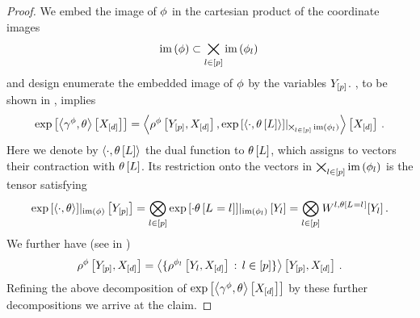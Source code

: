 \begin{proof}
    We embed the image of $\phi$ in the cartesian product of the coordinate images  %
    \begin{align*}
        \mathrm{im}\left(\phi\right) \subset \bigtimes_{l\in[p]} \mathrm{im}\left(\phi_{l}\right) \,
    \end{align*}
    and design enumerate the embedded image of $\phi$ by the variables $Y_{[p]}$.
    , to be shown in , implies
    \begin{align*}
        \mathrm{exp}\left[\left\langle \gamma^{\phi},\theta\right\rangle \left[ X_{[d]} \right]\right]
        = \left\langle 
            \rho^{\phi}\left[Y_{[p]},X_{[d]}\right],{\mathrm{exp}\left[\braket{\cdot,\theta\left[L\right]}\right]
            }|_{\bigtimes_{l\in[p]}\mathrm{im}\left(\phi_{l}\right)}\right\rangle \left[ X_{[d]} \right] \, .
    \end{align*}
    Here we denote by $\braket{\cdot,\theta\left[L\right]}$ the dual function to $\theta\left[L\right]$, which assigns to vectors their contraction with $\theta\left[L\right]$.
    Its restriction onto the vectors in $\bigtimes_{l\in[p]}\mathrm{im}\left(\phi_{l}\right)$ is the tensor satisfying
    \begin{align*}
        {\mathrm{exp}\left[\braket{\cdot,\theta}\right]}|_{\mathrm{im}\left(\phi\right)}\left[Y_{[p]}\right]
        = \bigotimes_{l\in[p]} {\mathrm{exp}\left[\cdot \theta\left[L_{}=l_{}\right]\right]}|_{\mathrm{im}\left(\phi_{l}\right)}\left[Y_{l}\right]
        = \bigotimes_{l\in[p]} W^{l,\theta\left[L_{}=l_{}\right]}[Y_{l}] \, .
    \end{align*}
    We further have (see  in )
    \begin{align*}
        \rho^{\phi}\left[Y_{[p]},X_{[d]}\right]
        = \left\langle \{\rho^{\phi_{l}}\left[Y_{l},X_{[d]}\right] \, : \, l\in[p]\}\right\rangle \left[ Y_{[p]},X_{[d]} \right] \, .
    \end{align*}
    Refining the above decomposition of $\mathrm{exp}\left[\left\langle \gamma^{\phi},\theta\right\rangle \left[ X_{[d]} \right]\right]$ by these further decompositions we arrive at the claim.
\end{proof}


